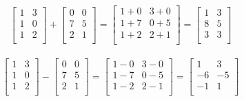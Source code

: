 \vspace{0.5cm}


\begin{align}\nonumber
	\left[\begin{matrix}
			1 & 3 \\
			1 & 0 \\
			1 & 2 \\
		\end{matrix} \right]
	+
	\left[\begin{matrix}
			0 & 0 \\
			7 & 5 \\
			2 & 1 \\
		\end{matrix} \right]
	=
	\left[\begin{matrix}
			1+0 & 3+0 \\
			1+7 & 0+5 \\
			1+2 & 2+1 \\
		\end{matrix} \right]
	=
	\left[\begin{matrix}
			1 & 3 \\
			8 & 5 \\
			3 & 3 \\
		\end{matrix} \right]
\end{align}

\begin{align}\nonumber
	\left[\begin{matrix}
			1 & 3 \\
			1 & 0 \\
			1 & 2 \\
		\end{matrix} \right]
	-
	\left[\begin{matrix}
			0 & 0 \\
			7 & 5 \\
			2 & 1 \\
		\end{matrix} \right]
	=
	\left[\begin{matrix}
			1-0 & 3-0 \\
			1-7 & 0-5 \\
			1-2 & 2-1 \\
		\end{matrix} \right]
	=
	\left[\begin{matrix}
			1  & 3  \\
			-6 & -5 \\
			-1 & 1  \\
		\end{matrix} \right]
\end{align}

